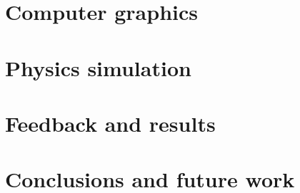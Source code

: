 \documentclass{sig-alternate}
\begin{document}
\section{Computer graphics}
\label{sec:computer_graphics}


\section{Physics simulation}
\label{sec:physics_simulation}


\section{Feedback and results}
\label{sec:feedback_and_results}


\section{Conclusions and future work}
\label{sec:conclusions}
 

\label{app:figures}
 


 

\nocite{}
\end{document}

